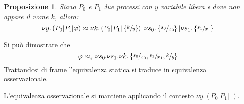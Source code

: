 \documentclass{beamer}
\newcounter{counter1}
\theoremstyle{plain}
\newtheorem{mypro}[counter1]{Proposizione}
\theoremstyle{definition}
\theoremstyle{remark}
\newcommand{\set}[1]{\left\{#1\right\}}
\newcommand{\pa}[1]{\left(#1\right)}
\begin{document}
\begin{frame}
  \begin{mypro}
    Siano $P_0$ e $P_1$ due processi con $y$ variabile libera e dove non
    appare il nome $k$, allora:
    \[ \nu y.\pa{ P_0 | P_1 | \varphi } \approx \nu k.\pa{ P_0|P_1 |
        \set{\sfrac{k}{y}}} | \nu s_0. \set{\sfrac{s_0}{x_0}} | \nu
      s_1.\set{\sfrac{s_1}{x_1}} \]
  \end{mypro}
  
  Si pu\`o dimostrare che
  \[ \varphi \approx _s \nu s_0.\nu s_1.\nu k.\set{\sfrac{s_0}{x_0},
      \sfrac{s_1}{x_1}, \sfrac{k}{y}} \]
  Trattandosi di frame l'equivalenza statica si traduce in equivalenza
  osservazionale.

  L'equivalenza osservazionale si mantiene applicando il contesto $\nu
  y.\pa{ P_0 | P_1 | \_ }$.
\end{frame}
\end{document}

